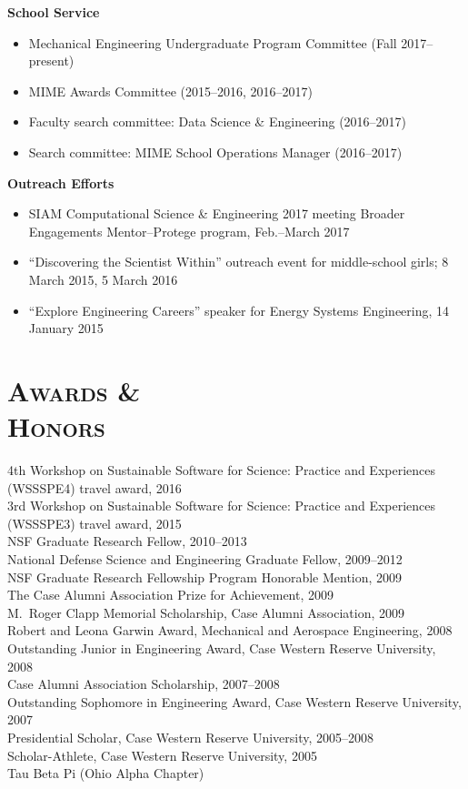 \documentclass[margin,line,11pt]{res}
\begin{document}
\begin{resume}
\textbf{School Service}
\begin{itemize}[leftmargin=*]
    \item Mechanical Engineering Undergraduate Program Committee (Fall 2017--present)
    \item MIME Awards Committee (2015--2016, 2016--2017)
    \item Faculty search committee: Data Science \& Engineering (2016--2017)
    \item Search committee: MIME School Operations Manager (2016--2017)
\end{itemize}

\textbf{Outreach Efforts}
\begin{itemize}[leftmargin=*]
    \item SIAM Computational Science \& Engineering 2017 meeting Broader Engagements Mentor--Protege program, Feb.--March 2017
    \item ``Discovering the Scientist Within'' outreach event for middle-school girls; 8 March 2015, 5 March 2016
    \item ``Explore Engineering Careers'' speaker for Energy Systems Engineering, 14 January 2015
\end{itemize}

\section{\textsc{Awards \& \\Honors}}
4th Workshop on Sustainable Software for Science: Practice and Experiences (WSSSPE4) travel award, 2016 \\
3rd Workshop on Sustainable Software for Science: Practice and Experiences (WSSSPE3) travel award, 2015 \\
NSF Graduate Research Fellow, 2010--2013 \\
National Defense Science and Engineering Graduate Fellow, 2009--2012 \\
NSF Graduate Research Fellowship Program Honorable Mention, 2009 \\
The Case Alumni Association Prize for Achievement, 2009 \\
M.\ Roger Clapp Memorial Scholarship, Case Alumni Association, 2009 \\
Robert and Leona Garwin Award, Mechanical and Aerospace Engineering, 2008 \\
Outstanding Junior in Engineering Award, Case Western Reserve University, 2008 \\
Case Alumni Association Scholarship, 2007--2008 \\
Outstanding Sophomore in Engineering Award, Case Western Reserve University, 2007 \\
Presidential Scholar, Case Western Reserve University, 2005--2008 \\
Scholar-Athlete, Case Western Reserve University, 2005 \\
Tau Beta Pi (Ohio Alpha Chapter)


\end{resume}
\end{document}
